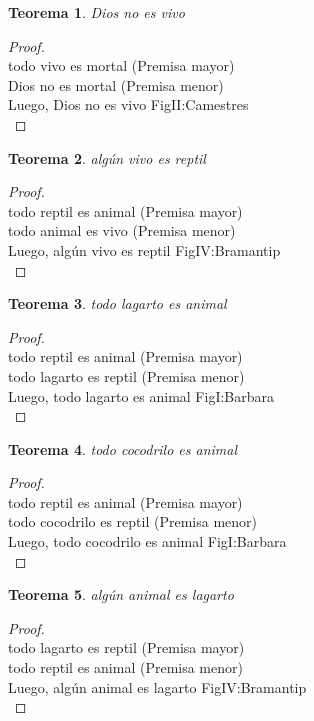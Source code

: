 ﻿\documentclass[12pt]{book}
\newtheorem{theorem}{Teorema}[chapter]
\newtheorem{proof}{Demostración}
\begin{document}
\begin{theorem}
Dios no es vivo
\label{th: 32}
\end{theorem}\begin{proof}\\todo vivo es mortal	 (Premisa mayor) \\Dios no es mortal	 (Premisa menor) \\Luego, Dios no es vivo	FigII:Camestres \\ \end{proof}
\begin{theorem}
algún vivo es reptil
\label{th: 33}
\end{theorem}\begin{proof}\\todo reptil es animal	 (Premisa mayor) \\todo animal es vivo	 (Premisa menor) \\Luego, algún vivo es reptil	FigIV:Bramantip \\ \end{proof}
\begin{theorem}
todo lagarto es animal
\label{th: 34}
\end{theorem}\begin{proof}\\todo reptil es animal	 (Premisa mayor) \\todo lagarto es reptil	 (Premisa menor) \\Luego, todo lagarto es animal	FigI:Barbara \\ \end{proof}
\begin{theorem}
todo cocodrilo es animal
\label{th: 35}
\end{theorem}\begin{proof}\\todo reptil es animal	 (Premisa mayor) \\todo cocodrilo es reptil	 (Premisa menor) \\Luego, todo cocodrilo es animal	FigI:Barbara \\ \end{proof}
\begin{theorem}
algún animal es lagarto
\label{th: 36}
\end{theorem}\begin{proof}\\todo lagarto es reptil	 (Premisa mayor) \\todo reptil es animal	 (Premisa menor) \\Luego, algún animal es lagarto	FigIV:Bramantip \\ \end{proof}
\end{document}
